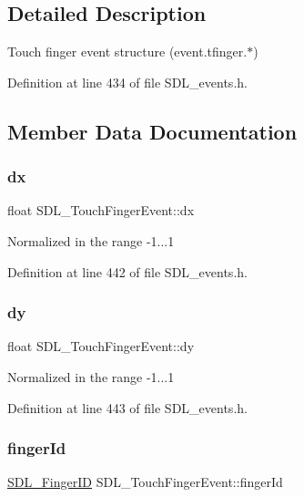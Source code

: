 \subsection{Detailed Description}
Touch finger event structure (event.\+tfinger.$\ast$) 

Definition at line 434 of file S\+D\+L\+\_\+events.\+h.



\subsection{Member Data Documentation}
\mbox{\label{struct_s_d_l___touch_finger_event_ac6acac209d6e2bd659fdb6760081393d}} 
\subsubsection{\texorpdfstring{dx}{dx}}
{\footnotesize\ttfamily float S\+D\+L\+\_\+\+Touch\+Finger\+Event\+::dx}

Normalized in the range -\/1...1 

Definition at line 442 of file S\+D\+L\+\_\+events.\+h.

\mbox{\label{struct_s_d_l___touch_finger_event_a9c0320c5f18a6b9d10da657e166608c9}} 
\subsubsection{\texorpdfstring{dy}{dy}}
{\footnotesize\ttfamily float S\+D\+L\+\_\+\+Touch\+Finger\+Event\+::dy}

Normalized in the range -\/1...1 

Definition at line 443 of file S\+D\+L\+\_\+events.\+h.

\mbox{\label{struct_s_d_l___touch_finger_event_a8616d46ed19906e3ee90a4d481d3a284}} 
\subsubsection{\texorpdfstring{fingerId}{fingerId}}
{\footnotesize\ttfamily \mbox{\hyperlink{_s_d_l__touch_8h_a5fa58141f78415ca09645af359ad2250}{S\+D\+L\+\_\+\+Finger\+ID}} S\+D\+L\+\_\+\+Touch\+Finger\+Event\+::finger\+Id}




